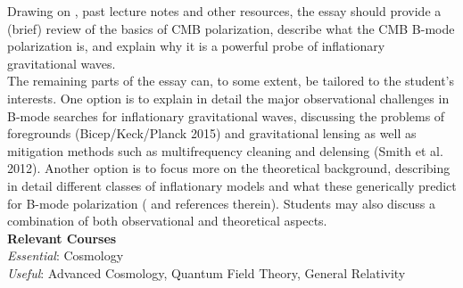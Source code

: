 \documentclass[a4paper,10pt]{article}
\begin{document}
Drawing on \cite{S4, QBM}, past lecture notes and other resources, the essay should provide a (brief) review of the basics of CMB polarization, describe what the CMB B-mode polarization is, and explain why it is a powerful probe of inflationary gravitational waves.\\

The remaining parts of the essay can, to some extent, be tailored to the student’s interests. One option is to explain in detail the major observational challenges in B-mode searches for inflationary gravitational waves, discussing the problems of foregrounds (Bicep/Keck/Planck 2015) and gravitational lensing as well as mitigation methods such as multifrequency cleaning and delensing (Smith et al. 2012). Another option is to focus more on the theoretical background, describing in detail different classes of inflationary models and what these generically predict for B-mode polarization (\cite{S4} and references therein). Students may also discuss a combination of both observational and theoretical aspects.\\

\textbf{Relevant Courses}\\

\textit{Essential}: Cosmology\\

\textit{Useful}: Advanced Cosmology, Quantum Field Theory, General Relativity\\















\end{document}
